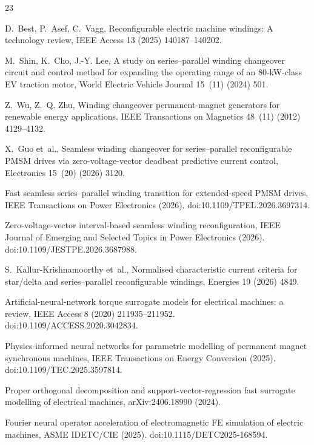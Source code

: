 \documentclass[review]{elsarticle}
\begin{document}

\begin{thebibliography}{23}

D.~Best, P.~Asef, C.~Vagg, Reconfigurable electric machine windings: A
technology review, IEEE Access 13 (2025) 140187--140202.

M.~Shin, K.~Cho, J.-Y. Lee, A study on series--parallel winding changeover
circuit and control method for expanding the operating range of an 80-kW-class
EV traction motor, World Electric Vehicle Journal 15~(11) (2024) 501.

Z.~Wu, Z.~Q. Zhu, Winding changeover permanent-magnet generators for
renewable energy applications, IEEE Transactions on Magnetics 48~(11) (2012)
4129--4132.

X.~Guo et~al., Seamless winding changeover for series--parallel
reconfigurable PMSM drives via zero-voltage-vector deadbeat predictive
current control, Electronics 15~(20) (2026) 3120.

Fast seamless series--parallel winding transition for extended-speed PMSM
drives, IEEE Transactions on Power Electronics (2026).
doi:10.1109/TPEL.2026.3697314.

Zero-voltage-vector interval-based seamless winding reconfiguration,
IEEE Journal of Emerging and Selected Topics in Power Electronics (2026).
doi:10.1109/JESTPE.2026.3687988.

S.~Kallur-Krishnamoorthy et~al., Normalised characteristic current criteria
for star/delta and series--parallel reconfigurable windings, Energies 19
(2026) 4849.

Artificial-neural-network torque surrogate models for electrical machines: a
review, IEEE Access 8 (2020) 211935--211952.
doi:10.1109/ACCESS.2020.3042834.

Physics-informed neural networks for parametric modelling of permanent
magnet synchronous machines, IEEE Transactions on Energy Conversion (2025).
doi:10.1109/TEC.2025.3597814.

Proper orthogonal decomposition and support-vector-regression fast surrogate
modelling of electrical machines, arXiv:2406.18990 (2024).

Fourier neural operator acceleration of electromagnetic FE simulation of
electric machines, ASME IDETC/CIE (2025). doi:10.1115/DETC2025-168594.


\end{thebibliography}
\end{document}
